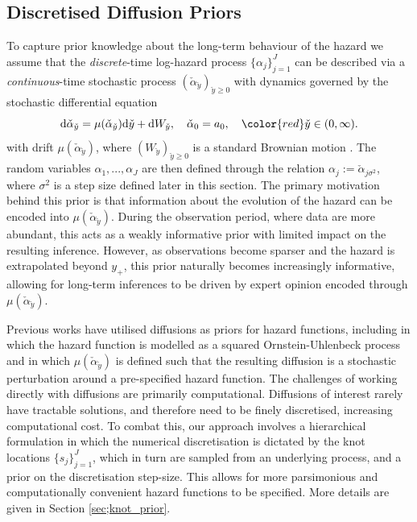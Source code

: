 \documentclass[ba,preprint]{imsart}
\theoremstyle{plain}
\theoremstyle{definition}
\theoremstyle{remark}
\begin{document}
\subsection{Discretised Diffusion Priors}
\label{sec;diff_prior}
To capture prior knowledge about the long-term behaviour of the hazard we assume that the \textit{discrete}-time log-hazard process $\{\alpha_j\}_{j=1}^J$ can be described via a \textit{continuous}-time stochastic process $(\check{\alpha}_{\check{y}})_{\check{y}\geq 0}$ with dynamics governed by the stochastic differential equation
\begin{equation}
    \label{eq;SDE}
     \text{d}\check{\alpha}_{\check{y}} = \mu(\check{\alpha}_{\check{y}} )\text{d}\check{y} + \text{d}W_{\check{y}}, \quad \check{\alpha}_0 = a_0, \quad {\color{red}\check{y} \in (0,\infty)}.
\end{equation}
with drift $\mu(\check{\alpha}_{\check{y}})$, where $(W_{\check{y}})_{\check{y}\geq 0}$ is a standard Brownian motion \citep{Oksendal2013}. The random variables $\alpha_1,...,\alpha_J$ are then defined through the relation $\alpha_j := \check{\alpha}_{j\sigma^2}$, where $\sigma^2$ is a step size defined later in this section. The primary motivation behind this prior is that information about the evolution of the hazard can be encoded into $\mu(\check{\alpha}_{\check{y}})$. During the observation period, where data are more abundant, this acts as a weakly informative prior with limited impact on the resulting inference. However, as observations become sparser and the hazard is extrapolated beyond $y_+$,  this prior naturally becomes increasingly informative, allowing for long-term inferences to be driven by expert opinion encoded through $\mu(\check{\alpha}_{\check{y}})$.

Previous works have utilised diffusions as priors for hazard functions, including \cite{Aalen2004} in which the hazard function is modelled as a squared Ornstein-Uhlenbeck process and \cite{Roberts2010} in which $\mu(\check{\alpha}_{\check{y}})$ is defined such that the resulting diffusion is a stochastic perturbation around a pre-specified hazard function. The challenges of working directly with diffusions are primarily computational. Diffusions of interest rarely have tractable solutions, and therefore need to be finely discretised, increasing computational cost. To combat this, our approach involves a hierarchical formulation in which the numerical discretisation is dictated by the knot locations $\{s_j\}_{j=1}^J$, which in turn are sampled from an underlying process, and a prior on the discretisation step-size. This allows for more parsimonious and computationally convenient hazard functions to be specified.  More details are given in Section \ref{sec;knot_prior}.
\end{document}
